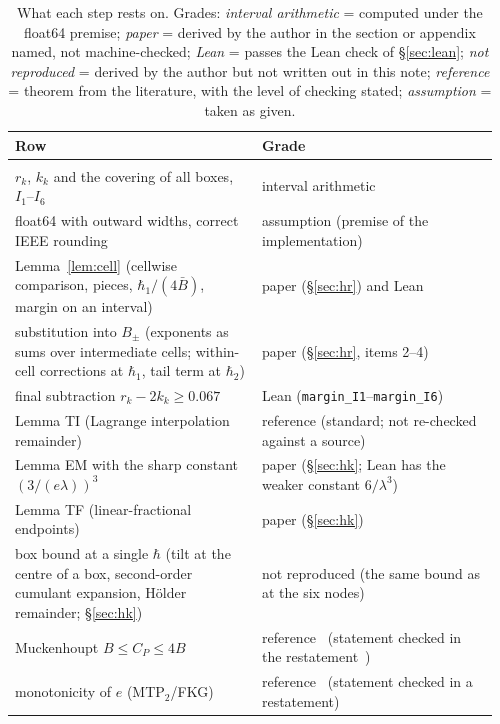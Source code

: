 \documentclass[11pt,a4paper]{article}
\theoremstyle{definition}
\theoremstyle{remark}
\begin{document}
\begin{table}[!htbp]\centering\footnotesize
\caption{What each step rests on. Grades: \emph{interval arithmetic} = computed under the float64 premise; \emph{paper} = derived by the author in the section or appendix named, not machine-checked; \emph{Lean} = passes the Lean check of \S\ref{sec:lean}; \emph{not reproduced} = derived by the author but not written out in this note; \emph{reference} = theorem from the literature, with the level of checking stated; \emph{assumption} = taken as given.}\label{tab:status}
\begin{tabular}{@{}>{\raggedright\arraybackslash}p{0.49\linewidth}>{\raggedright\arraybackslash}p{0.47\linewidth}@{}}\toprule
Row & Grade\\\midrule
\multicolumn{2}{@{}l}{\emph{The margin on $[0.005/1.17^6,\,0.005]$ (\S\S\ref{sec:scheme}--\ref{sec:results})}}\\
$r_k$, $k_k$ and the covering of all boxes, $I_1$--$I_6$ & interval arithmetic\\
float64 with outward widths, correct IEEE rounding & assumption (premise of the implementation)\\
Lemma~\ref{lem:cell} (cellwise comparison, pieces, $\hbar_1/(4\bar B)$, margin on an interval) & paper (\S\ref{sec:hr}) and Lean\\
substitution into $B_\pm$ (exponents as sums over intermediate cells; within-cell corrections at $\hbar_1$, tail term at $\hbar_2$) & paper (\S\ref{sec:hr}, items 2--4)\\
final subtraction $r_k-2k_k\ge0.067$ & Lean (\texttt{margin\_I1}--\texttt{margin\_I6})\\
Lemma TI (Lagrange interpolation remainder) & reference (standard; not re-checked against a source)\\
Lemma EM with the sharp constant $(3/(e\lambda))^3$ & paper (\S\ref{sec:hk}; Lean has the weaker constant $6/\lambda^3$)\\
Lemma TF (linear-fractional endpoints) & paper (\S\ref{sec:hk})\\
box bound at a single $\hbar$ (tilt at the centre of a box, second-order cumulant expansion, Hölder remainder; \S\ref{sec:hk}) & not reproduced (the same bound as at the six nodes)\\
Muckenhoupt $B\le C_P\le4B$ & reference~\cite{Mu,BR} (statement checked in the restatement~\cite{BR})\\
monotonicity of $e$ (MTP$_2$/FKG) & reference~\cite{KR} (statement checked in a restatement)\\

\end{tabular}
\end{table}
\end{document}
